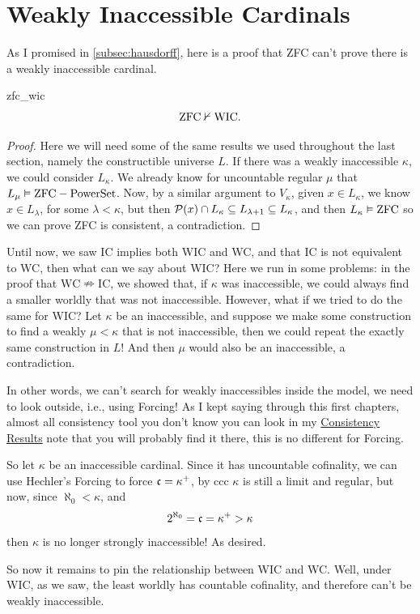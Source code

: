 \section{Weakly Inaccessible Cardinals}

As I promised in \cref{subsec:hausdorff}, here is a proof that ZFC can't prove there is a weakly inaccessible cardinal.

\begin{theorem}{}{zfc_wic}
    $$\mathrm{ZFC}\nvdash\mathrm{WIC}.$$
\end{theorem}

\begin{proof}
    Here we will need some of the same results we used throughout the last section, namely the constructible universe $L$. If there was a weakly inaccessible $\kappa$, we could consider $L_\kappa$. We already know for uncountable regular $\mu$ that $L_\mu\vDash\mathrm{ZFC}-\text{PowerSet}$. Now, by a similar argument to $V_\kappa$, given $x\in L_\kappa$, we know $x\in L_\lambda$, for some $\lambda<\kappa$, but then $\mathcal{P}(x)\cap L_\kappa\subseteq L_{\lambda+1}\subseteq L_\kappa$, and then $L_\kappa\vDash\mathrm{ZFC}$ so we can prove ZFC is consistent, a contradiction.
\end{proof}

Until now, we saw IC implies both WIC and WC, and that IC is not equivalent to WC, then what can we say about WIC? Here we run in some problems: in the proof that $\mathrm{WC}\nRightarrow\mathrm{IC}$, we showed that, if $\kappa$ was inaccessible, we could always find a smaller worldly that was not inaccessible. However, what if we tried to do the same for WIC? Let $\kappa$ be an inaccessible, and suppose we make some construction to find a weakly $\mu<\kappa$ that is not inaccessible, then we could repeat the exactly same construction in $L$! And then $\mu$ would also be an inaccessible, a contradiction.

In other words, we can't search for weakly inaccessibles inside the model, we need to look outside, i.e., using Forcing! As I kept saying through this first chapters, almost all consistency tool you don't know you can look in my \href{https://github.com/Xennonio/Consistency-Results}{Consistency Results} note that you will probably find it there, this is no different for Forcing.

So let $\kappa$ be an inaccessible cardinal. Since it has uncountable cofinality, we can use Hechler's Forcing to force $\mathfrak{c}=\kappa^+$, by ccc $\kappa$ is still a limit and regular, but now, since $\aleph_0<\kappa$, and
$$2^{\aleph_0}=\mathfrak{c}=\kappa^+>\kappa$$
then $\kappa$ is no longer strongly inaccessible! As desired.

So now it remains to pin the relationship between WIC and WC. Well, under WIC, as we saw, the least worldly has countable cofinality, and therefore can't be weakly inaccessible.